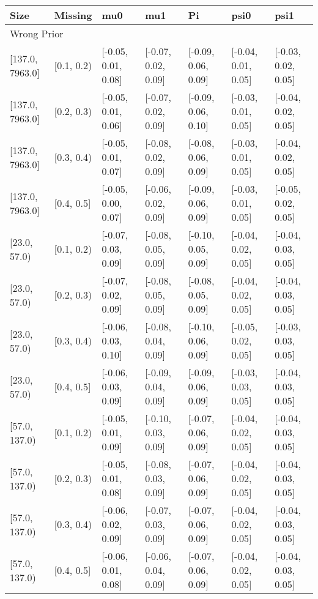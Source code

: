 \begin{table}[ht]
\centering
\begin{tabular}{lllllll}
  \toprule
Size & Missing & mu0 & mu1 & Pi & psi0 & psi1 \\ 
  \midrule
\multicolumn{7}{l}{Wrong Prior}\\
{[137.0, 7963.0]} & {[0.1, 0.2)} & {[-0.05, 0.01, 0.08]} & {[-0.07, 0.02, 0.09]} & {[-0.09, 0.06, 0.09]} & {[-0.04, 0.01, 0.05]} & {[-0.03, 0.02, 0.05]} \\ 
  {[137.0, 7963.0]} & {[0.2, 0.3)} & {[-0.05, 0.01, 0.06]} & {[-0.07, 0.02, 0.09]} & {[-0.09, 0.06, 0.10]} & {[-0.03, 0.01, 0.05]} & {[-0.04, 0.02, 0.05]} \\ 
  {[137.0, 7963.0]} & {[0.3, 0.4)} & {[-0.05, 0.01, 0.07]} & {[-0.08, 0.02, 0.09]} & {[-0.08, 0.06, 0.09]} & {[-0.03, 0.01, 0.05]} & {[-0.04, 0.02, 0.05]} \\ 
  {[137.0, 7963.0]} & {[0.4, 0.5]} & {[-0.05, 0.00, 0.07]} & {[-0.06, 0.02, 0.09]} & {[-0.09, 0.06, 0.09]} & {[-0.03, 0.01, 0.05]} & {[-0.05, 0.02, 0.05]} \\ 
  {[23.0, 57.0)} & {[0.1, 0.2)} & {[-0.07, 0.03, 0.09]} & {[-0.08, 0.05, 0.09]} & {[-0.10, 0.05, 0.09]} & {[-0.04, 0.02, 0.05]} & {[-0.04, 0.03, 0.05]} \\ 
  {[23.0, 57.0)} & {[0.2, 0.3)} & {[-0.07, 0.02, 0.09]} & {[-0.08, 0.05, 0.09]} & {[-0.08, 0.05, 0.09]} & {[-0.04, 0.02, 0.05]} & {[-0.04, 0.03, 0.05]} \\ 
  {[23.0, 57.0)} & {[0.3, 0.4)} & {[-0.06, 0.03, 0.10]} & {[-0.08, 0.04, 0.09]} & {[-0.10, 0.06, 0.09]} & {[-0.05, 0.02, 0.05]} & {[-0.03, 0.03, 0.05]} \\ 
  {[23.0, 57.0)} & {[0.4, 0.5]} & {[-0.06, 0.03, 0.09]} & {[-0.09, 0.04, 0.09]} & {[-0.09, 0.06, 0.09]} & {[-0.03, 0.03, 0.05]} & {[-0.04, 0.03, 0.05]} \\ 
  {[57.0, 137.0)} & {[0.1, 0.2)} & {[-0.05, 0.01, 0.09]} & {[-0.10, 0.03, 0.09]} & {[-0.07, 0.06, 0.09]} & {[-0.04, 0.02, 0.05]} & {[-0.04, 0.03, 0.05]} \\ 
  {[57.0, 137.0)} & {[0.2, 0.3)} & {[-0.05, 0.01, 0.08]} & {[-0.08, 0.03, 0.09]} & {[-0.07, 0.06, 0.09]} & {[-0.04, 0.02, 0.05]} & {[-0.04, 0.03, 0.05]} \\ 
  {[57.0, 137.0)} & {[0.3, 0.4)} & {[-0.06, 0.02, 0.09]} & {[-0.07, 0.03, 0.09]} & {[-0.07, 0.06, 0.09]} & {[-0.04, 0.02, 0.05]} & {[-0.04, 0.03, 0.05]} \\ 
  {[57.0, 137.0)} & {[0.4, 0.5]} & {[-0.06, 0.01, 0.08]} & {[-0.06, 0.04, 0.09]} & {[-0.07, 0.06, 0.09]} & {[-0.04, 0.02, 0.05]} & {[-0.04, 0.03, 0.05]} \\ 

\end{tabular}
\end{table}
